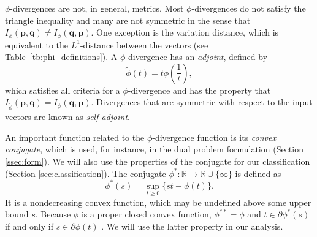 \documentclass[opre,nonblindrev]{informs3} %
\newcommand{\R}{{\mathbb{R}}}
\newcommand{\q}{\mathbf{q}}
\newcommand{\p}{\mathbf{p}}
\begin{document}
$\phi$-divergences are not, in general, metrics.
Most $\phi$-divergences do not satisfy the triangle inequality and many are not symmetric in the sense that $I_\phi(\p,\q) \neq I_\phi(\q,\p)$.
One exception is the variation distance, which is equivalent to the $L^1$-distance between the vectors (see Table~\ref{tb:phi_definitions}).
A $\phi$-divergence has an {\it adjoint}, defined by
\begin{equation} \label{eq:adjoint}
	\tilde{\phi}(t) = t \phi\left(\frac{1}{t}\right),
\end{equation}
which satisfies all criteria for a $\phi$-divergence \citep{bental1991certainty} and has the property that $I_{\tilde{\phi}}(\p,\q) = I_\phi(\q,\p)$.
Divergences that are symmetric with respect to the input vectors are known as {\it self-adjoint}.

An important function related to the $\phi$-divergence function is its  {\it  convex conjugate}, which is used, for instance, in the dual problem formulation (Section \ref{ssec:form}). 
We will also use the properties of the conjugate for our classification (Section \ref{sec:classification}). 
The conjugate $\phi^* : \R \rightarrow \R \cup \{\infty\}$ is defined as
\begin{equation} \label{eq:conjugate}
	\phi^*(s) = \sup_{t \geq 0} \{st - \phi(t)\}.
\end{equation}
It is a nondecreasing convex function, which may be undefined above some upper bound $\bar{s}$.
Because $\phi$ is a proper closed convex function, $\phi^{**}=\phi$ and $t \in \partial \phi^*(s)$ if and only if $s \in \partial \phi(t)$ \citep[Corollary 23.5.1]{rockafellar_70}. 
We will use the latter property in our analysis. 
 
\end{document}
